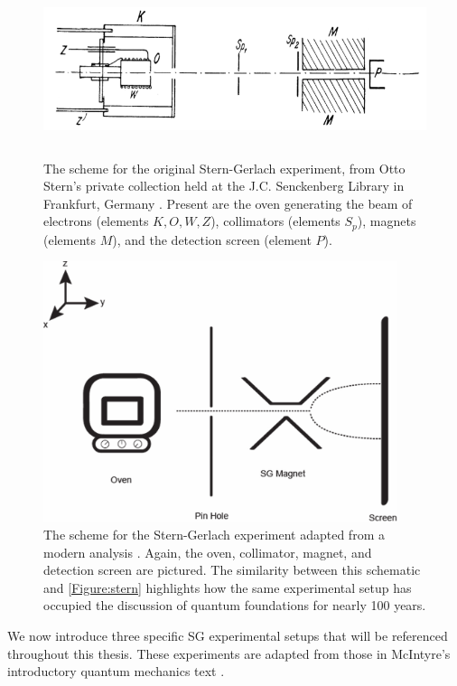 \begin{figure}[!tb]
\centering\CaptionFontSize
\includegraphics[height=2.0in]
{Figure-stern}
\caption[Otto Stern's scheme for the original Stern-Gerlach experiment]
  {The scheme for the original Stern-Gerlach experiment, from Otto Stern's private collection held at the J.C. Senckenberg Library in Frankfurt, Germany \cite{bocking}. Present are the oven generating the beam of electrons (elements $K,O,W,Z$), collimators (elements $S_p$), magnets (elements $M$), and the detection screen (element $P$).}
\label{Figure:stern}
\end{figure}

\begin{figure}[!tb]
\centering\CaptionFontSize
\includegraphics[height=3.0in]
{Figure-new-stern}
\caption[Scheme for the Stern-Gerlach experiment from a modern analysis]
  {The scheme for the Stern-Gerlach experiment adapted from a modern analysis \cite{rodriguez}. Again, the oven, collimator, magnet, and detection screen are pictured. The similarity between this schematic and \autoref{Figure:stern} highlights how the same experimental setup has occupied the discussion of quantum foundations for nearly 100 years.}
\label{Figure:new stern}
\end{figure}

We now introduce three specific SG experimental setups that will be referenced throughout this thesis. These experiments are adapted from those in McIntyre's introductory quantum mechanics text \cite{mcintyre}.
